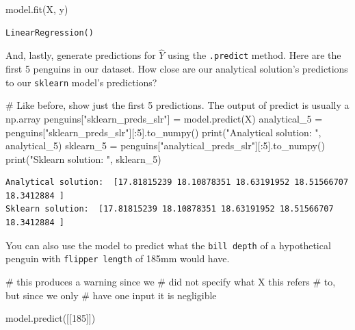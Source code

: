 \documentclass[
  letterpaper,
  DIV=11,
  numbers=noendperiod]{scrreprt}
\newenvironment{Shaded}{\begin{snugshade}}{\end{snugshade}}
\newcommand{\BuiltInTok}[1]{\textcolor[rgb]{0.00,0.23,0.31}{#1}}
\newcommand{\CommentTok}[1]{\textcolor[rgb]{0.37,0.37,0.37}{#1}}
\newcommand{\DecValTok}[1]{\textcolor[rgb]{0.68,0.00,0.00}{#1}}
\newcommand{\NormalTok}[1]{\textcolor[rgb]{0.00,0.23,0.31}{#1}}
\newcommand{\OperatorTok}[1]{\textcolor[rgb]{0.37,0.37,0.37}{#1}}
\newcommand{\StringTok}[1]{\textcolor[rgb]{0.13,0.47,0.30}{#1}}
\begin{document}
\begin{Shaded}
\begin{Highlighting}[]
\NormalTok{model.fit(X, y)}
\end{Highlighting}
\end{Shaded}

\begin{verbatim}
LinearRegression()
\end{verbatim}

And, lastly, generate predictions for \(\hat{Y}\) using the
\texttt{.predict} method. Here are the first 5 penguins in our dataset.
How close are our analytical solution's predictions to our
\texttt{sklearn} model's predictions?

\begin{Shaded}
\begin{Highlighting}[]
\CommentTok{\# Like before, show just the first 5 predictions. The output of predict is usually a np.array}
\NormalTok{penguins[}\StringTok{"sklearn\_preds\_slr"}\NormalTok{] }\OperatorTok{=}\NormalTok{ model.predict(X)}
\NormalTok{analytical\_5 }\OperatorTok{=}\NormalTok{ penguins[}\StringTok{"sklearn\_preds\_slr"}\NormalTok{][:}\DecValTok{5}\NormalTok{].to\_numpy()}
\BuiltInTok{print}\NormalTok{(}\StringTok{"Analytical solution: "}\NormalTok{, analytical\_5)}
\NormalTok{sklearn\_5 }\OperatorTok{=}\NormalTok{ penguins[}\StringTok{"analytical\_preds\_slr"}\NormalTok{][:}\DecValTok{5}\NormalTok{].to\_numpy()}
\BuiltInTok{print}\NormalTok{(}\StringTok{"Sklearn solution: "}\NormalTok{, sklearn\_5)}
\end{Highlighting}
\end{Shaded}

\begin{verbatim}
Analytical solution:  [17.81815239 18.10878351 18.63191952 18.51566707 18.3412884 ]
Sklearn solution:  [17.81815239 18.10878351 18.63191952 18.51566707 18.3412884 ]
\end{verbatim}

You can also use the model to predict what the \texttt{bill\ depth} of a
hypothetical penguin with \texttt{flipper\ length} of 185mm would have.

\begin{Shaded}
\begin{Highlighting}[]
\CommentTok{\# this produces a warning since we}
\CommentTok{\# did not specify what X this refers}
\CommentTok{\# to, but since we only }
\CommentTok{\# have one input it is negligible}

\NormalTok{model.predict([[}\DecValTok{185}\NormalTok{]]) }
\end{Highlighting}
\end{Shaded}
\end{document}
